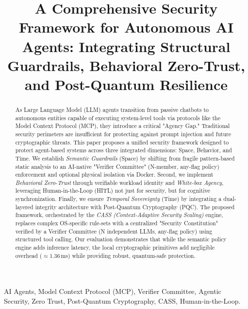 \documentclass[conference]{IEEEtran}
\begin{document}
\title{A Comprehensive Security Framework for Autonomous AI Agents: Integrating Structural Guardrails, Behavioral Zero-Trust, and Post-Quantum Resilience}

\author{
}

\maketitle

\begin{abstract}
As Large Language Model (LLM) agents transition from passive chatbots to autonomous entities capable of executing system-level tools via protocols like the Model Context Protocol (MCP), they introduce a critical "Agency Gap." Traditional security perimeters are insufficient for protecting against prompt injection and future cryptographic threats. This paper proposes a unified security framework designed to protect agent-based systems across three integrated dimensions: Space, Behavior, and Time. We establish \textit{Semantic Guardrails} (Space) by shifting from fragile pattern-based static analysis to an AI-native "Verifier Committee" (N-member, any-flag policy) enforcement and optional physical isolation via Docker. Second, we implement \textit{Behavioral Zero-Trust} through verifiable workload identity and \textit{White-box Agency}, leveraging Human-in-the-Loop (HITL) not just for security, but for cognitive synchronization. Finally, we ensure \textit{Temporal Sovereignty} (Time) by integrating a dual-layered integrity architecture with Post-Quantum Cryptography (PQC). The proposed framework, orchestrated by the \textit{CASS (Context-Adaptive Security Scaling)} engine, replaces complex OS-specific rule-sets with a centralized "Security Constitution" verified by a Verifier Committee (N independent LLMs, any-flag policy) using structured tool calling. Our evaluation demonstrates that while the semantic policy engine adds inference latency, the local cryptographic primitives add negligible overhead ($\approx$1.36\,ms) while providing robust, quantum-safe protection.
\end{abstract}

\begin{IEEEkeywords}
AI Agents, Model Context Protocol (MCP), Verifier Committee, Agentic Security, Zero Trust, Post-Quantum Cryptography, CASS, Human-in-the-Loop.
\end{IEEEkeywords}
\end{document}
